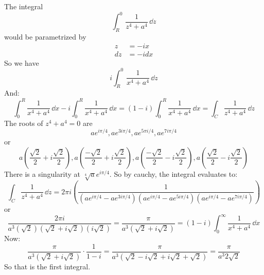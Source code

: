 \documentclass{article}
\begin{document}
\begin{answer}
            The integral 
                \begin{equation*}
                    \int_{R}^{0} \dfrac{1}{z^{4} + a^{4}} \, \dd{z} 
                \end{equation*}
            would be parametrized by 
                \begin{align*}
                    z   &= -ix   \\
                    dz  &= -id x 
                \end{align*}
            So we have
                \begin{equation*}
                    i\int_{R}^{0} \dfrac{1}{x^{4} + a^{4}} \, \dd{z} 
                \end{equation*}
            And:
                \begin{equation*}
                    \int_{0}^{R} \dfrac{1}{x^{4} + a^{4}} \, \dd{x} - i \int_{0}^{R} \dfrac{1}{x^{4} + a^{4}} \, \dd{x}  = (1 - i)\int_{0}^{R} \dfrac{1}{x^{4} + a^{4}} \, \dd{x}  = \int_{C}^{} \dfrac{1}{z^{4} + a^{4}} \, \dd{z} 
                \end{equation*}
            The roots of $z^{4} + a^{4} = 0$ are 
                \begin{equation*}
                    ae^{i\pi/4}, ae^{3i \pi/4}, ae^{5\pi i / 4}, ae^{7i \pi/4}
                \end{equation*}
            or
                \begin{equation*}
                    a(\dfrac{\sqrt{2}}{2} + i\dfrac{\sqrt{2}}{2}), a(\dfrac{-\sqrt{2}}{2} + i \dfrac{\sqrt{2}}{2}), a(\dfrac{-\sqrt{2}}{2} - i \dfrac{\sqrt{2}}{2}), a(\dfrac{\sqrt{2}}{2} - i \dfrac{\sqrt{2}}{2})
                \end{equation*}
            There is a singularity at $\sqrt[4]{a}e^{i\pi/4}$. So by cauchy, the integral evaluates to:
                \begin{equation*}
                    \int_{C}^{} \dfrac{1}{z^{4} + a^{4}} \, \dd{z}  = 2\pi i (\dfrac{1}{(ae^{i\pi/4} - ae^{3i\pi/4})(ae^{i\pi/4} - ae^{5i\pi/4})(ae^{i\pi/4} - ae^{7i\pi/4})})
                \end{equation*}
            or
                \begin{equation*}
                    \dfrac{2\pi i}{a^{3}(\sqrt{2})(\sqrt{2} + i\sqrt{2})(i\sqrt{2})} = \dfrac{\pi}{a^{3}(\sqrt{2} + i\sqrt{2})} = (1 - i)\int_{0}^{\infty} \dfrac{1}{x^{4} + a^{4}} \, \dd{x} 
                \end{equation*}
            Now:
                \begin{equation*}
                    \dfrac{\pi}{a^{3}(\sqrt{2} + i\sqrt{2})} \cdot \dfrac{1}{1 - i} = \dfrac{\pi}{a^{3}(\sqrt{2} - i\sqrt{2} + i\sqrt{2} + \sqrt{2})} = \dfrac{\pi}{a^{3}2\sqrt{2}}
                \end{equation*}
            So that is the first integral.


\end{answer}
\end{document}
